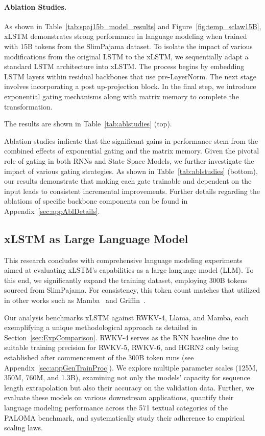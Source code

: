 \paragraph{Ablation Studies.}
As shown in Table~\ref{tab:spaj15b_model_results} and Figure~\ref{fig:temp_sclaw15B}, xLSTM demonstrates strong performance in language modeling when trained with 15B tokens from the SlimPajama dataset. To isolate the impact of various modifications from the original LSTM to the xLSTM, we sequentially adapt a standard LSTM architecture into xLSTM. The process begins by embedding LSTM layers within residual backbones that use pre-LayerNorm. The next stage involves incorporating a post up-projection block. In the final step, we introduce exponential gating mechanisms along with matrix memory to complete the transformation.

The results are shown in Table~\ref{tab:ablstudies} (top). 

Ablation studies indicate that the significant gains in performance stem from the combined effects of exponential gating and the matrix memory. Given the pivotal role of gating in both RNNs and State Space Models, we further investigate the impact of various gating strategies. As shown in Table~\ref{tab:ablstudies} (bottom), our results demonstrate that making each gate trainable and dependent on the input leads to consistent incremental improvements. Further details regarding the ablations of specific backbone components can be found in Appendix~\ref{sec:appAblDetails}.

\subsection{xLSTM as Large Language Model}
\label{sec:ExpLanguage}

This research concludes with comprehensive language modeling experiments aimed at evaluating xLSTM’s capabilities as a large language model (LLM). To this end, we significantly expand the training dataset, employing 300B tokens sourced from SlimPajama. For consistency, this token count matches that utilized in other works such as Mamba~\citep{Gu:24arxiv} and Griffin~\citep{De:24arxiv}.

Our analysis benchmarks xLSTM against RWKV-4, Llama, and Mamba, each exemplifying a unique methodological approach as detailed in Section~\ref{sec:ExpComparison}. RWKV-4 serves as the RNN baseline due to suitable training precision for RWKV-5, RWKV-6, and HGRN2 only being established after commencement of the 300B token runs (see Appendix~\ref{sec:appGenTrainProc}). We explore multiple parameter scales (125M, 350M, 760M, and 1.3B), examining not only the models’ capacity for sequence length extrapolation but also their accuracy on the validation data. Further, we evaluate these models on various downstream applications, quantify their language modeling performance across the 571 textual categories of the PALOMA benchmark, and systematically study their adherence to empirical scaling laws.

